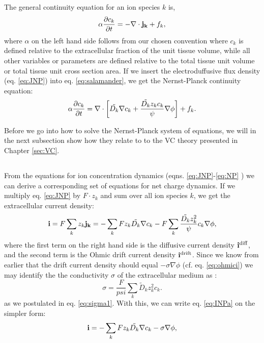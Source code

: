 The general continuity equation for an ion species $k$ is,
\begin{equation}
\alpha \frac{\partial c_k}{\partial t} = - \nabla \cdot {\bf j_k} + f_k,
\label{eq:salamander}
\end{equation}
where $\alpha$ on the left hand side follows from our chosen convention where $c_k$ is defined relative to the extracellular fraction of the unit tissue volume, while all other variables or parameters are defined relative to the total tissue unit volume or total tissue unit cross section area. If we insert the electroduffusive flux density (eq. \ref{eq:JNP}) into eq. \ref{eq:salamander},
we get the Nernst-Planck continuity equation:
\begin{equation}
\alpha \frac{\partial c_k}{\partial t} = {\bf \nabla} \cdot \left[ \tilde{D_k} {\bf \nabla} c_k + \frac{\tilde{D_k} z_k c_k}{\psi} {\bf \nabla} \phi \right] + f_k.
\label{eq:NP}
\end{equation}

Before we go into how to solve the Nernst-Planck system of equations, we will in the next subsection show how they relate to to the VC theory presented in Chapter \ref{sec:VC}.


\subsection{}
From the equations for ion concentration dynamics (eqns. \ref{eq:JNP}-\ref{eq:NP} ) we can derive a corresponding set of equations for net charge dynamics. If we multiply eq. \ref{eq:JNP} by $F\cdot z_k$ and sum over all ion species $k$, we get the extracellular current density:
\begin{equation}
{\bf i} = F\sum_k {z_k {\bf j_k}} = -\sum_k{F z_k \tilde{D_k}{\bf \nabla} c_{k}} - F\sum_{k} \frac{\tilde{D_k} z_{k}^2}{\psi}c_{k} {\bf \nabla}{\phi}, 
\label{eq:INPa}
\end{equation}
where the first term on the right hand side is the diffusive current density ${\bf i^\text{diff}}$, and the second term is the Ohmic drift current density ${\bf i^\text{drift}}$. Since we know from earlier that the drift current density should equal $- \sigma \nabla \phi$  (cf. eq. \ref{eq:ohmici}) we may identify the the conductivity $\sigma$ of the extracellular medium as \citep{Koch1999}:
\begin{equation}
\sigma = \frac{F}{psi}\sum_{k} \tilde{D}_k z_{k}^2 c_{k}.
\label{eq:sigma}
\end{equation}
as we postulated in eq. \ref{eq:sigma1}. With this, we can write eq. \ref{eq:INPa} on the simpler form:
\begin{equation}
{\bf i} = - \sum_k{F z_k \tilde{D_k}{\bf \nabla} c_{k}} - \sigma{\bf \nabla}{\phi},
\label{eq:INP}
\end{equation}

